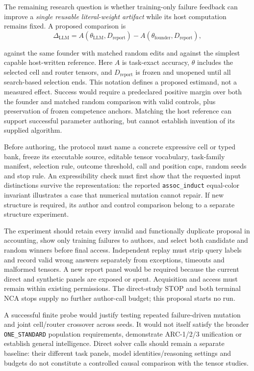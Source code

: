 \documentclass[11pt]{article}
\begin{document}
\begin{samepage}
The remaining research question is whether training-only failure feedback can improve a
\emph{single reusable literal-weight artifact} while its host computation remains fixed.
A proposed comparison is
\[
\Delta_{\mathrm{LLM}} =
 A(\theta_{\mathrm{LLM}},D_{\mathrm{report}})
 - A(\theta_{\mathrm{founder}},D_{\mathrm{report}}),
\]
\end{samepage}
against the same founder with matched random edits and against the simplest capable
host-written reference. Here $A$ is task-exact accuracy, $\theta$ includes the selected
cell and router tensors, and $D_{\mathrm{report}}$ is frozen and unopened until all
search-based selection ends. This notation defines a proposed estimand, not a measured
effect. Success would require a predeclared positive margin over both the founder and
matched random comparison with valid controls, plus preservation of frozen competence
anchors. Matching the host reference can support successful parameter authoring, but
cannot establish invention of its supplied algorithm.

Before authoring, the protocol must name a concrete expressive cell or typed bank,
freeze its executable source, editable tensor vocabulary, task-family manifest,
selection rule, outcome threshold, call and position caps, random seeds and stop rule.
An expressibility check must first show that the requested input distinctions survive
the representation: the reported \texttt{assoc\_induct} equal-color invariant illustrates
a case that numerical mutation cannot repair. If new structure is required, its author
and control comparison belong to a separate structure experiment.

The experiment should retain every invalid and functionally duplicate proposal in
accounting, show only training failures to authors, and select both candidate and
random winners before final access. Independent replay must strip query labels and
record valid wrong answers separately from exceptions, timeouts and malformed tensors.
A new report panel would be required because the current direct and synthetic panels
are exposed or spent. Acquisition and access must remain within existing permissions.
The direct-study STOP and both terminal NCA stops supply no further author-call budget; this proposal
starts no run.

A successful finite probe would justify testing repeated failure-driven mutation and
joint cell/router crossover across seeds. It would not itself satisfy the broader
\texttt{ONE\_STANDARD} population requirements, demonstrate ARC-1/2/3 unification or
establish general intelligence. Direct solver calls should remain a separate baseline:
their different task panels, model identities/reasoning settings and budgets do not
constitute a controlled causal comparison with the tensor studies.
\end{document}
